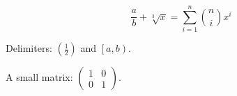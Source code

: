 \[
  \frac{a}{b} + \sqrt[3]{x} = \sum_{i=1}^{n} \binom{n}{i} x^i
\]

Delimiters: $\left( \frac{1}{2} \right)$ and $\left[ a, b \right)$.

A small matrix: $\begin{pmatrix} 1 & 0 \\ 0 & 1 \end{pmatrix}$.

